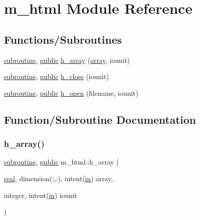 \hypertarget{namespacem__html}{}\section{m\+\_\+html Module Reference}
\label{namespacem__html}
\subsection*{Functions/\+Subroutines}
\begin{DoxyCompactItemize}
\item 
\hyperlink{M__stopwatch_83_8txt_acfbcff50169d691ff02d4a123ed70482}{subroutine}, \hyperlink{M__stopwatch_83_8txt_a2f74811300c361e53b430611a7d1769f}{public} \hyperlink{namespacem__html_ad97e98e7241f29c59740757fecd5e6ce}{h\+\_\+array} (\hyperlink{intro__blas1_83_8txt_a89db1945e1a335ab0184c6a097821e32}{array}, iounit)
\item 
\hyperlink{M__stopwatch_83_8txt_acfbcff50169d691ff02d4a123ed70482}{subroutine}, \hyperlink{M__stopwatch_83_8txt_a2f74811300c361e53b430611a7d1769f}{public} \hyperlink{namespacem__html_a3c7065739f09d91dd595f97ebb21583d}{h\+\_\+close} (iounit)
\item 
\hyperlink{M__stopwatch_83_8txt_acfbcff50169d691ff02d4a123ed70482}{subroutine}, \hyperlink{M__stopwatch_83_8txt_a2f74811300c361e53b430611a7d1769f}{public} \hyperlink{namespacem__html_a2188f9871e716a7812d2ab9fb91fde40}{h\+\_\+open} (filename, iounit)
\end{DoxyCompactItemize}


\subsection{Function/\+Subroutine Documentation}
\mbox{\label{namespacem__html_ad97e98e7241f29c59740757fecd5e6ce}} 
\subsubsection{\texorpdfstring{h\+\_\+array()}{h\_array()}}
{\footnotesize\ttfamily \hyperlink{M__stopwatch_83_8txt_acfbcff50169d691ff02d4a123ed70482}{subroutine}, \hyperlink{M__stopwatch_83_8txt_a2f74811300c361e53b430611a7d1769f}{public} m\+\_\+html\+::h\+\_\+array (\begin{DoxyParamCaption}\item[{\hyperlink{read__watch_83_8txt_abdb62bde002f38ef75f810d3a905a823}{real}, dimension(\+:,\+:), intent(\hyperlink{M__journal_83_8txt_afce72651d1eed785a2132bee863b2f38}{in})}]{array,  }\item[{integer, intent(\hyperlink{M__journal_83_8txt_afce72651d1eed785a2132bee863b2f38}{in})}]{iounit }\end{DoxyParamCaption})}

